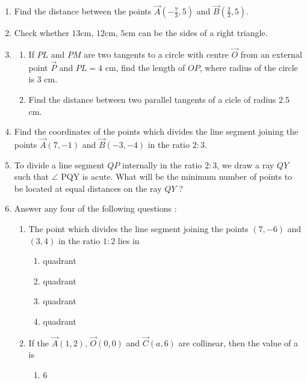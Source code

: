 \begin{enumerate}[label=\thesubsection.\arabic*.,ref=\thesubsection.\theenumi]		
	\item Find the distance between the points $\vec{A}(-\frac{7}{3},5)$ and $\vec{B}(\frac{2}{3},5)$.                  	\item Check whether $13$cm, $12$cm, $5$cm can be the sides of a right triangle.
	\item \begin{enumerate}[label=(\alph*)]
			\item If $PL$ and $PM$ are two tangents to a circle with centre $\vec{O}$ from an external point $\vec{P}$ and $PL=4$ cm, find the length of $OP$, where radius of the circle is 3 cm.
		\item Find the distance between two parallel tangents of a cicle of radius $2.5$ cm.
             \end{enumerate}
     \item Find the coordinates of the points which divides the line segment joining the points $\vec{A}(7,-1)$ and $\vec{B}(-3,-4)$ in the ratio $2:3$.	
     \item To divide a line segment $QP$ internally in the ratio $2:3$, we draw a ray $QY$ such that $\angle$ PQY is acute. What will be  the minimum number of points to be located at equal distances on the ray $QY$ ?
     \item Answer any four of the following questions :
	     \begin{enumerate}[label=(\roman*)]
		     \item The point which divides the line segment joining the points $(7,-6)$ and $(3,4)$ in the ratio $1:2$ lies in
			     \begin{enumerate}[label=(\Alph*)]
                              \item {} quadrant
			      \item {} quadrant
			      \item {} quadrant
			      \item {} quadrant
			     \end{enumerate}
		     \item If the $\vec{A}(1, 2)$, $\vec{O}(0, 0)$ and $\vec{C}(a, 6)$ are collinear, then the value of a is
			     \begin{enumerate}[label=(\Alph*)]
				     \item $6$

\end{enumerate}
\end{enumerate}
\end{enumerate}
